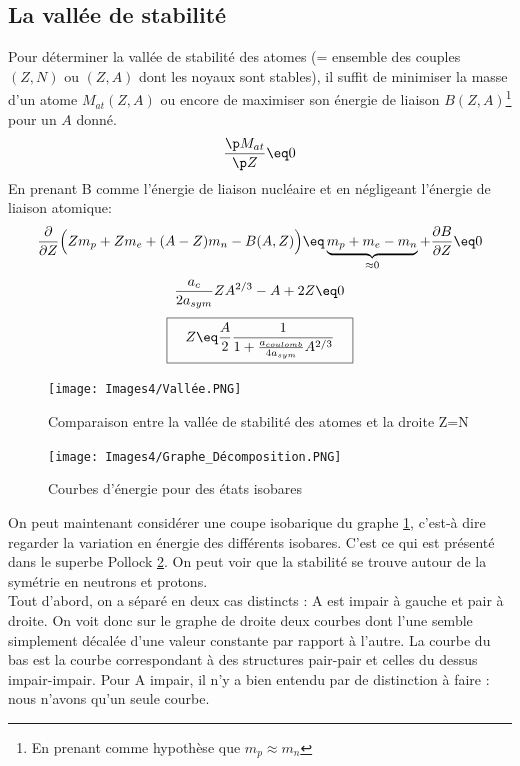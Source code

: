 \subsection{La vallée de stabilité}


Pour déterminer la vallée de stabilité des atomes (= ensemble des couples $(Z,N)$ ou $(Z,A)$ dont les noyaux sont stables), il suffit de minimiser la masse d'un atome $M_{at}(Z,A)$ ou encore de maximiser son énergie de liaison $B(Z,A)$\footnote{En prenant comme hypothèse que $m_p \approx m_n$} pour un $A$ donné.
\begin{equation*}
    \dfrac{\p M_{at}}{\p Z} \eq 0
\end{equation*}
En prenant B comme l'énergie de liaison nucléaire et en négligeant l'énergie de liaison atomique:
\begin{equation*}
    \dfrac{\partial}{\partial Z}\Big(Zm_p + Zm_e + (A-Z)m_n -B(A,Z)\Big) 
    \eq \underbrace{m_p + m_e - m_n}_{\approx 0} + \dfrac{\partial B}{\partial Z}
    \eq 0
\end{equation*}
\begin{equation*}
    \frac{a_c}{2a_{sym}}Z A^{2/3} - A + 2Z \eq 0
\end{equation*}
\begin{equation*}
    \boxed{\quad
        Z \eq \frac{A}{2} \frac{1}{1 + \frac{a_{coulomb}}{4a_{sym}}A^{2/3}}\quad
    }
\end{equation*}
\begin{figure}[H]
    \centering
    \texttt{[image: Images4/Vallée.PNG]}
    \caption{Comparaison entre la vallée de stabilité des atomes et la droite Z=N}
    \label{vallee}
\end{figure}
\begin{figure}[H]
    \centering
    \texttt{[image: Images4/Graphe\_Décomposition.PNG]}
    \caption{Courbes d'énergie pour des états isobares}
    \label{decomp_noyau}
\end{figure}
On peut maintenant considérer une coupe isobarique du graphe \ref{vallee}, c'est-à dire regarder la variation en énergie des différents isobares. C'est ce qui est présenté dans le superbe Pollock \ref{decomp_noyau}. On peut voir que la stabilité se trouve autour de la symétrie en neutrons et protons.\\

Tout d'abord, on a séparé en deux cas distincts : A est impair à gauche et pair à droite. On voit donc sur le graphe de droite deux courbes dont l'une semble simplement décalée d'une valeur constante par rapport à l'autre. La courbe du bas est la courbe correspondant à des structures pair-pair et celles du dessus impair-impair. Pour A impair, il n'y a bien entendu par de distinction à faire : nous n'avons qu'un seule courbe.\\

